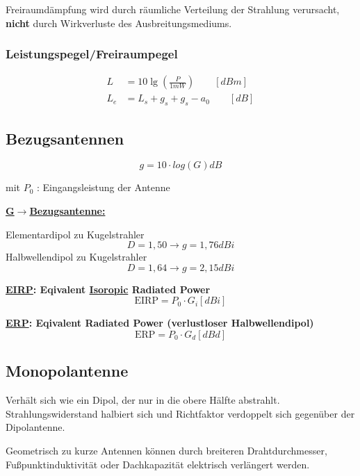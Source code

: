 Freiraumdämpfung wird durch räumliche Verteilung der Strahlung verursacht,
\textbf{nicht} durch Wirkverluste des Ausbreitungsmediums.

\subsubsection{Leistungspegel/Freiraumpegel}
\begin{align*}
	L     & = 10 \lg \left(\frac{P}{1 \si{mW}}\right) \qquad [\si{dBm}] \\
	L_{e} & = L_{s}+g_{s}+g_{s}-a_{0} \qquad [\si{dB}]
\end{align*}

\subsection{Bezugsantennen}
\[
	\boxed{g = 10 \cdot log(G) \si{dB}}
\]

mit $P_0$ : Eingangsleistung der Antenne

\begin{description}
	\item \textbf{\underline{G$\rightarrow$Bezugsantenne:}}

	      Elementardipol  zu Kugelstrahler \[D = 1,50 \rightarrow g = 1,76\si{dBi}\]
	      Halbwellendipol zu Kugelstrahler \[D = 1,64 \rightarrow g = 2,15\si{dBi}\]

	\item \textbf{\underline{EIRP}: Eqivalent \underline{Isoropic} Radiated Power}
	      \[
		      \text{EIRP} = P_0 \cdot G_i [\si{dBi}]
	      \]

	\item \textbf{\underline{ERP}: Eqivalent Radiated Power (verlustloser Halbwellendipol)}
	      \[
		      \text{ERP} = P_0 \cdot G_d [\si{dBd}]
	      \]
\end{description}

\subsection{Monopolantenne}
Verhält sich wie ein Dipol, der nur in die obere Hälfte abstrahlt.
Strahlungswiderstand halbiert sich und Richtfaktor verdoppelt sich gegenüber
der Dipolantenne.

Geometrisch zu kurze Antennen können durch breiteren Drahtdurchmesser,
Fußpunktinduktivität oder Dachkapazität elektrisch verlängert werden.
